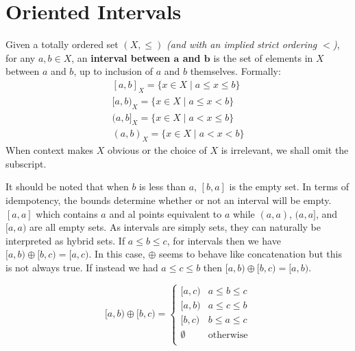 \newpage


%
%

\section{Oriented Intervals}

\begin{definition}
	Given a totally ordered set $(X, \leq)$ \emph{(and with an implied strict ordering $<$)}, 
	for any $a,b \in X$, an \textbf{interval between $\boldsymbol{a}$ and $\boldsymbol{b}$} 
	is the set of elements in $X$ between $a$ and $b$, up to inclusion of $a$ and $b$ themselves. 
	Formally:
	\begin{equation} 
	\begin{array}{cc}
		{[a,b]}_X =  \{ x \in X \;|\; a \leq x \leq b \} \\
		{[a,b)}_X =  \{ x \in X \;|\; a \leq x < b \} \\
		{(a,b]}_X =  \{ x \in X \;|\; a < x \leq b \} \\
		{(a,b)}_X =  \{ x \in X \;|\; a < x < b \}
	\end{array} 
	\end{equation}
	When context makes $X$ obvious or the choice of $X$ is irrelevant, we shall omit the subscript.
\end{definition}

It should be noted that when $b$ is less than $a$, $[b,a]$ is the empty set. 
In terms of idempotency, the bounds determine whether or not an interval will be empty.
$[a,a]$ which contains $a$ and al points equivalent to $a$ while $(a,a)$, $(a,a]$, and $[a,a)$ are all empty sets.
As intervals are simply sets, they can naturally be interpreted as hybrid sets.
If $a \leq b \leq c$, for intervals then we have $[a,b) \oplus [b,c) = [a,c)$.
In this case, $\oplus$ seems to behave like concatenation but this is not always true.
If instead we had $a \leq c \leq b$ then $[a,b) \oplus [b,c) = [a,b)$.

\begin{equation}
	[a,b) \oplus [b,c) =
	\begin{cases}
		[a,c) & a \leq b \leq c \\
		[a,b) & a \leq c \leq b \\
		[b,c) & b \leq a \leq c \\
		\emptyset & \text{otherwise} \\
	\end{cases}
\end{equation}

